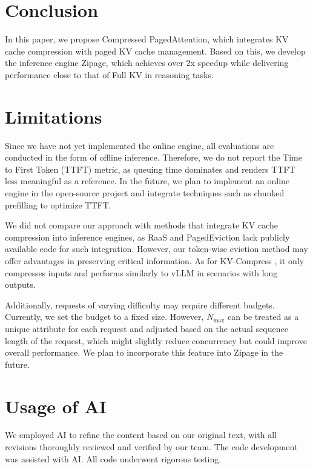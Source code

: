 \documentclass[11pt]{article}
\begin{document}
\section{Conclusion}

In this paper, we propose Compressed PagedAttention, which integrates KV cache compression with paged KV cache management. Based on this, we develop the inference engine Zipage, which achieves over 2x speedup while delivering performance close to that of Full KV in reasoning tasks.

\section*{Limitations}

Since we have not yet implemented the online engine, all evaluations are conducted in the form of offline inference. Therefore, we do not report the Time to First Token (TTFT) metric, as queuing time dominates and renders TTFT less meaningful as a reference. In the future, we plan to implement an online engine in the open-source project and integrate techniques such as chunked prefilling \citep{agrawal2023sarathi} to optimize TTFT.

We did not compare our approach with methods that integrate KV cache compression into inference engines, as RaaS \cite{raas} and PagedEviction \cite{pagedeviction} lack publicly available code for such integration. However, our token-wise eviction method may offer advantages in preserving critical information. As for KV-Compress \citep{rehg2024kv}, it only compresses inputs and performs similarly to vLLM in scenarios with long outputs.

Additionally, requests of varying difficulty may require different budgets. Currently, we set the budget to a fixed size. However, $N_{\max}$ can be treated as a unique attribute for each request and adjusted based on the actual sequence length of the request, which might slightly reduce concurrency but could improve overall performance. We plan to incorporate this feature into Zipage in the future.






%



\appendix

\section{Usage of AI}  
We employed AI to refine the content based on our original text, with all revisions thoroughly reviewed and verified by our team. The code development was assisted with AI. All code underwent rigorous testing.
\end{document}
